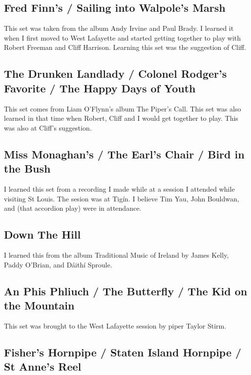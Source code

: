 \documentclass[9pt,letterpaper]{article}
\begin{document}
{\subsection{Fred Finn's / Sailing into Walpole's Marsh}

This set was taken from the album Andy Irvine and Paul Brady. I learned it when I first moved to West Lafayette and started getting together to play with Robert Freeman and Cliff Harrison. Learning this set was the suggestion of Cliff.

\subsection{The Drunken Landlady / Colonel Rodger's Favorite / The Happy Days of Youth}

This set comes from Liam O'Flynn's album The Piper's Call. This set was also learned in that time when Robert, Cliff and I would get together to play. This was also at Cliff's suggestion.

\subsection{Miss Monaghan's / The Earl's Chair / Bird in the Bush}

I learned this set from a recording I made while at a session I attended while visiting St Louis. The sesion was at Tig\'in. I believe Tim Yau, John Bouldwan, and (that accordion play) were in attendance.

\subsection{Down The Hill}

I learned this from the album Traditional Music of Ireland by James Kelly, Paddy O'Brian, and D\'aith\'i Sproule.

\subsection{An Phis Phliuch / The Butterfly / The Kid on the Mountain}

This set was brought to the West Lafayette session by piper Taylor Stirm.

\subsection{Fisher's Hornpipe / Staten Island Hornpipe / St Anne's Reel}

}
\end{document}
